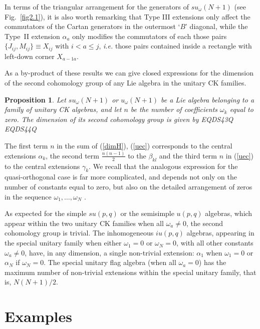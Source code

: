 \documentclass[12pt]{article}
\newtheorem{proposition}{Proposition}[section]}
\begin{document}
In terms of the triangular arrangement for the generators of
${su}_{\omega}(N+1)$ (see Fig.~\ref{fig2.1}), it is also  worth remarking
that   Type III extensions only affect the commutators of the Cartan
generators in the outermost `$B$' diagonal, while the Type~II extension
${\alpha}_a$  only modifies the commutators of each those pairs
$\{{J}_{ij},{M}_{ij}\}\equiv{X}_{ij}$ with $i<a \leq j$, {\it i.e.} those pairs
contained inside a rectangle
with left-down corner ${X}_{a-1 a}$.

As a by-product of these results we can give closed expressions for
the dimension of the second cohomology group of any Lie algebra in
the unitary CK families.

\begin{proposition}
\label{prop4.1}
Let ${su}_{\omega}(N+1)$ or ${u}_{\omega}(N+1)$
be a Lie algebra belonging
to a family of unitary CK algebras, and let $n$ be the
number of coefficients ${\omega}_k$ equal to zero. The dimension of
its second cohomology group is given by
EQDS43Q
EQDS44Q
\end{proposition}

The first term $n$ in the sum of (\ref{dimH}), (\ref{uec}) corresponds to the
central extensions ${{\alpha}_{k}}$, the second term $\frac
{n(n-1)}{2}$ to the ${\beta}_{kl}$ and the third term $n$ in (\ref{uec})
to the central extensions ${\gamma}_k$. We recall that the analogous
expression for the quasi-orthogonal case is far more complicated,
and depends not only on the number of constants equal to zero, but
also on the detailed arrangement of zeros in the sequence ${\omega}_1,
\dots, {\omega}_N$ \cite{Azc.Her.Bue.San:96}.

As expected for the simple
$su({p,q})$ or the semisimple $u({p,q})$ algebras, which appear within the
two unitary CK families when all
${\omega}_a\ne 0$, the second cohomology group is trivial. The inhomogeneous
$iu({p,q})$ algebras, appearing in the special unitary family when either
${\omega}_1=0$ or
${\omega}_N=0$, with all other constants ${\omega}_a
\neq 0$, have, in any dimension, a single non-trivial extension:
${\alpha}_{1}$ when ${\omega}_1=0$ or ${\alpha}_{N}$ if ${\omega}_N=0$.
The  special unitary flag algebra (when all ${\omega}_a= 0$) has the maximum
number of non-trivial extensions within the special unitary family, that
is, ${N(N+1)}/2$.

\section{Examples}
\label{sec.4}
\end{document}
